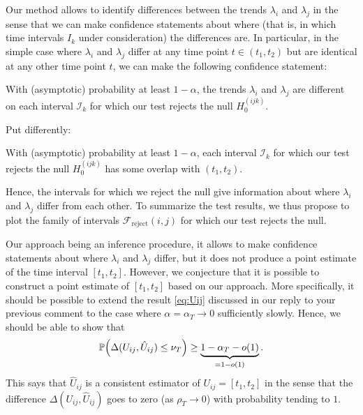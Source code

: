 \documentclass[a4paper,12pt]{article}
\begin{document}
\begin{enumerate}[label=(\arabic*),leftmargin=0.7cm]
Our method allows to identify differences between the trends $\lambda_i$ and $\lambda_j$ in the sense that we can make confidence statements about where (that is, in which time intervals $I_k$ under consideration) the differences are. In particular, in the simple case where $\lambda_i$ and $\lambda_j$ differ at any time point $t \in (t_1,t_2)$ but are identical at any other time point $t$, we can make the following confidence statement: 
\begin{center}
\begin{minipage}{0.85\textwidth}
With (asymptotic) probability at least $1-\alpha$, the trends $\lambda_i$ and $\lambda_j$ are different on each interval $\mathcal{I}_k$ for which our test rejects the null $H_0^{(ijk)}$.
\end{minipage}
\end{center}
Put differently:
\begin{center}
\begin{minipage}{0.85\textwidth}
With (asymptotic) probability at least $1-\alpha$, each interval $\mathcal{I}_k$ for which our test rejects the null $H_0^{(ijk)}$ has some overlap with $(t_1,t_2)$.
\end{minipage}
\end{center}
Hence, the intervals for which we reject the null give information about where $\lambda_i$ and $\lambda_j$ differ from each other. To summarize the test results, we thus propose to plot the family of intervals $\mathcal{F}_{\text{reject}}(i,j)$ for which our test rejects the null. 


Our approach being an inference procedure, it allows to make confidence statements about where $\lambda_i$ and $\lambda_j$ differ, but it does not produce a point estimate of the time interval $[t_1,t_2]$. However, we conjecture that it is possible to construct a point estimate of $[t_1,t_2]$ based on our approach. More specifically, it should be possible to extend the result \eqref{eq:Uij} discussed in our reply to your previous comment to the case where $\alpha = \alpha_T \to 0$ sufficiently slowly. Hence, we should be able to show that 
\begin{equation}\label{eq:Uij-conjecture}
\mathbb{P} \Big( \Delta(U_{ij}, \hat{U}_{ij}) \le \nu_T \Big) \ge \underbrace{1-\alpha_T - o(1)}_{= 1 - o(1)}.
\end{equation}
This says that $\hat{U}_{ij}$ is a consistent estimator of $U_{ij} = [t_1,t_2]$ in the sense that the difference $\Delta(U_{ij}, \hat{U}_{ij})$ goes to zero (as $\rho_T \to 0$) with probability tending to $1$. 


\end{enumerate}
\end{document}
